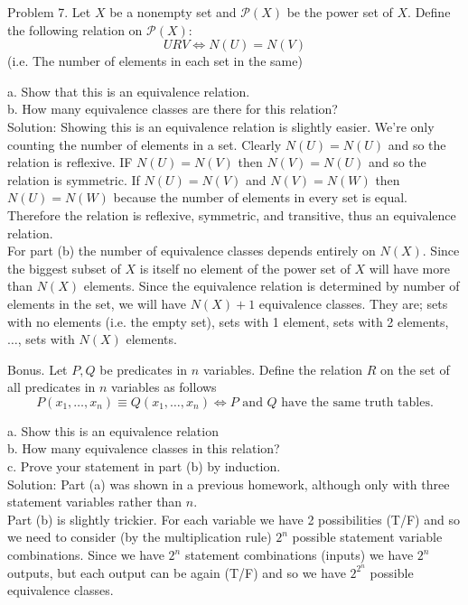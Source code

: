 \documentclass[16 pt]{amsart}
\theoremstyle{definition}
\theoremstyle{remark}
\numberwithin{equation}{subsection}
\begin{document}
\newpage
Problem 7. Let $X$ be a nonempty set and $\mathcal{P}(X)$ be the power set of $X$.  Define the following relation on $\mathcal{P}(X)$:
\[
U R V \Longleftrightarrow N(U) = N(V)
\]
(i.e. The number of elements in each set in the same)


a. Show that this is an equivalence relation.\\


b. How many equivalence classes are there for this relation?\\

Solution: Showing this is an equivalence relation is slightly easier.  We're only counting the number of elements in a set.  Clearly $N(U)=N(U)$ and so the relation is reflexive.  IF $N(U)=N(V)$ then $N(V)=N(U)$ and so the relation is symmetric.  If $N(U)=N(V)$ and $N(V)=N(W)$ then $N(U)=N(W)$ because the number of elements in every set is equal.  Therefore the relation is reflexive, symmetric, and transitive, thus an equivalence relation.\\

For part (b) the number of equivalence classes depends entirely on $N(X)$.  Since the biggest subset of $X$ is itself no element of the power set of $X$ will have more than $N(X)$ elements.  Since the equivalence relation is determined by number of elements in the set, we will have $N(X)+1$ equivalence classes.
They are; sets with no elements (i.e. the empty set), sets with 1 element, sets with 2 elements, $\dots$, sets with $N(X)$ elements.



\newpage
Bonus. Let $P,Q$ be predicates in $n$ variables.  Define the relation $R$ on the set of all predicates in $n$ variables as follows
\[
P(x_1,\dots, x_n) \equiv Q(x_1,\dots, x_n) \Longleftrightarrow \text{$P$ and $Q$ have the same truth tables.}
\]

a. Show this is an equivalence relation\\
b. How many equivalence classes in this relation?\\
c. Prove your statement in part (b) by induction.\\

Solution: Part (a) was shown in a previous homework, although only with three statement variables rather than $n$.\\
Part (b) is slightly trickier.  For each variable we have 2 possibilities (T/F) and so we need to consider (by the multiplication rule) $2^n$ possible statement variable combinations.  Since we have $2^n$ statement combinations (inputs) we have $2^n$ outputs, but each output can be again (T/F) and so we have $2^{2^n}$ possible equivalence classes.\\
\end{document}
